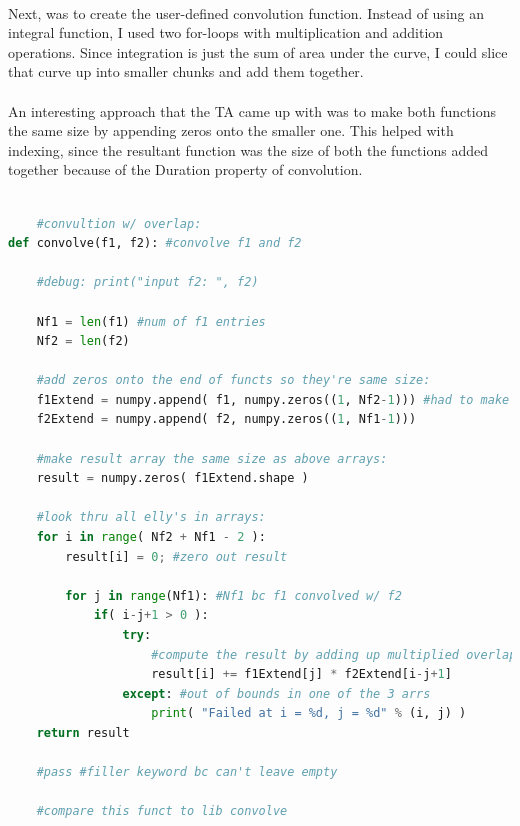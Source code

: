 \documentclass[12pt]{report}
\begin{document}
    \paragraph{} Next, was to create the user-defined convolution function. Instead of using an integral function, I used two for-loops with multiplication and addition operations. Since integration is just the sum of area under the curve, I could slice that curve up into smaller chunks and add them together. 

    \paragraph{} An interesting approach that the TA came up with was to make both functions the same size by appending zeros onto the smaller one. This helped with indexing, since the resultant function was the size of both the functions added together because of the Duration property of convolution.  

    \begin{lstlisting}[language=Python] 

    #convultion w/ overlap:
def convolve(f1, f2): #convolve f1 and f2
    
    #debug: print("input f2: ", f2)

    Nf1 = len(f1) #num of f1 entries
    Nf2 = len(f2)

    #add zeros onto the end of functs so they're same size:
    f1Extend = numpy.append( f1, numpy.zeros((1, Nf2-1))) #had to make numpy.zero() arg a tupple
    f2Extend = numpy.append( f2, numpy.zeros((1, Nf1-1)))
    
    #make result array the same size as above arrays:
    result = numpy.zeros( f1Extend.shape )
    
    #look thru all elly's in arrays:
    for i in range( Nf2 + Nf1 - 2 ):
        result[i] = 0; #zero out result
        
        for j in range(Nf1): #Nf1 bc f1 convolved w/ f2
            if( i-j+1 > 0 ):
                try:
                    #compute the result by adding up multiplied overlapping pnts:
                    result[i] += f1Extend[j] * f2Extend[i-j+1]  
                except: #out of bounds in one of the 3 arrs
                    print( "Failed at i = %d, j = %d" % (i, j) )
    return result  
    
    #pass #filler keyword bc can't leave empty
    
    #compare this funct to lib convolve

    \end{lstlisting}
\end{document}

